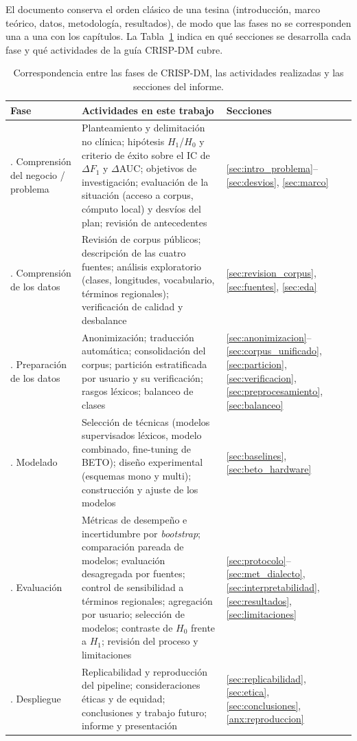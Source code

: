 \documentclass[12pt,a4paper]{article}
\begin{document}
El documento conserva el orden clásico de una tesina (introducción, marco teórico, datos, metodología, resultados), de modo que las fases no se corresponden una a una con los capítulos. La Tabla~\ref{tab:crispdm} indica en qué secciones se desarrolla cada fase y qué actividades de la guía CRISP-DM cubre.

\begin{table}[htbp]
\centering
\small
\caption{Correspondencia entre las fases de CRISP-DM, las actividades realizadas y las secciones del informe.}
\label{tab:crispdm}
\begin{tabularx}{\textwidth}{>{\raggedright\arraybackslash}p{3.1cm}>{\raggedright\arraybackslash}X>{\raggedright\arraybackslash}p{3.0cm}}
\toprule
\textbf{Fase} & \textbf{Actividades en este trabajo} & \textbf{Secciones} \\
\midrule
1. Comprensión del negocio / problema & Planteamiento y delimitación no clínica; hipótesis $H_1$/$H_0$ y criterio de éxito sobre el IC de $\Delta F_1$ y $\Delta$AUC; objetivos de investigación; evaluación de la situación (acceso a corpus, cómputo local) y desvíos del plan; revisión de antecedentes & \ref{sec:intro_problema}--\ref{sec:desvios}, \ref{sec:marco} \\
\addlinespace
2. Comprensión de los datos & Revisión de corpus públicos; descripción de las cuatro fuentes; análisis exploratorio (clases, longitudes, vocabulario, términos regionales); verificación de calidad y desbalance & \ref{sec:revision_corpus}, \ref{sec:fuentes}, \ref{sec:eda} \\
\addlinespace
3. Preparación de los datos & Anonimización; traducción automática; consolidación del corpus; partición estratificada por usuario y su verificación; rasgos léxicos; balanceo de clases & \ref{sec:anonimizacion}--\ref{sec:corpus_unificado}, \ref{sec:particion}, \ref{sec:verificacion}, \ref{sec:preprocesamiento}, \ref{sec:balanceo} \\
\addlinespace
4. Modelado & Selección de técnicas (modelos supervisados léxicos, modelo combinado, fine-tuning de BETO); diseño experimental (esquemas mono y multi); construcción y ajuste de los modelos & \ref{sec:baselines}, \ref{sec:beto_hardware} \\
\addlinespace
5. Evaluación & Métricas de desempeño e incertidumbre por \emph{bootstrap}; comparación pareada de modelos; evaluación desagregada por fuentes; control de sensibilidad a términos regionales; agregación por usuario; selección de modelos; contraste de $H_0$ frente a $H_1$; revisión del proceso y limitaciones & \ref{sec:protocolo}--\ref{sec:met_dialecto}, \ref{sec:interpretabilidad}, \ref{sec:resultados}, \ref{sec:limitaciones} \\
\addlinespace
6. Despliegue & Replicabilidad y reproducción del pipeline; consideraciones éticas y de equidad; conclusiones y trabajo futuro; informe y presentación & \ref{sec:replicabilidad}, \ref{sec:etica}, \ref{sec:conclusiones}, \ref{anx:reproduccion} \\
\bottomrule
\end{tabularx}
\end{table}
\end{document}
